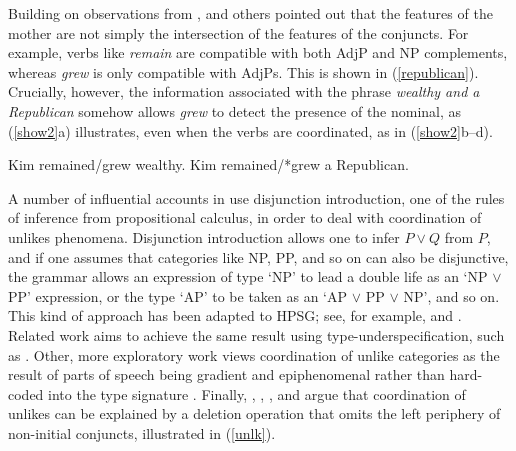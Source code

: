 {\noindent
Building on observations from \citet[417]{jacobson}, \citet{Sag:03} and others pointed out
that the features of the mother are not simply the intersection of the features of the conjuncts. 
For example, verbs like \emph{remain} are compatible with both
AdjP and NP complements, whereas \emph{grew}
is only compatible with AdjPs.
This is shown in  (\ref{republican}).
Crucially, however, the information associated with
the phrase \emph{wealthy and a Republican}
somehow allows \emph{grew} to detect the presence of
the nominal, as (\ref{show2}a) illustrates, even
when the verbs
are coordinated, as in (\ref{show2}b--d).


\begin{exe}
\ex
\begin{xlista}
\ex  Kim remained/grew wealthy.
\ex  Kim remained/*grew a Republican.
\end{xlista}\label{republican}
\end{exe}



\begin{exe}
\ex
\begin{xlista}
\end{xlista}\label{show2}
\end{exe}


A number of influential accounts in 
\citep{morrill90,morrill94,bayer}\addpages  use  disjunction introduction, 
one of the rules of
inference from propositional calculus,  in order to deal with
coordination of unlikes phenomena. Disjunction introduction 
 allows  one to infer $P \vee Q$ from  $P$, and if one assumes
 that categories like NP, PP, and so on can also be disjunctive, the grammar allows an expression of type `NP' to lead a double life as an `NP $\vee$ PP' expression,
or the type `AP' to be taken as an `AP $\vee$ PP $\vee$ NP', and so
on. This kind of approach has been adapted to HPSG; see, for example, \citet{Daniels02} and  \citet{Yatabe:04}.
Related work aims to achieve the same result using type-underspecification, such as 
 \citet{Sag:03}. Other, more exploratory work views coordination of unlike categories as the result of parts of speech being gradient and  epiphenomenal rather than hard-coded into the type signature \citep{Chaves2013b-u}. Finally, \citet{berthold0}, \citet{yatabe},  \citet{Beavers}, and \citet{chaves06}  argue that
coordination of unlikes can be explained by
a deletion operation that omits the left periphery of
non-initial conjuncts, illustrated in   (\ref{unlk}).

}
